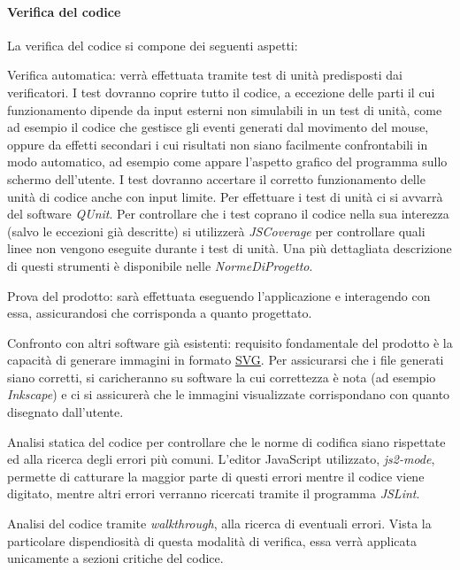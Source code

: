 \paragraph{Verifica del codice}
La verifica del codice si compone dei seguenti aspetti:
\begin{elenconumerato}[\textbf{}]{\subsubsecindent}
\item Verifica automatica: verr\`a effettuata tramite test di unit\`a predisposti dai verificatori. I test dovranno coprire tutto il codice, a eccezione delle parti il cui funzionamento dipende da input esterni non simulabili in un test di unit\`a, come ad esempio il codice che gestisce gli eventi generati dal movimento del mouse, oppure da effetti secondari i cui risultati non siano facilmente confrontabili in modo automatico, ad esempio come appare l'aspetto grafico del programma sullo schermo dell'utente. I test dovranno accertare il corretto funzionamento delle unit\`a di codice anche con input limite. Per effettuare i test di unit\`a ci si avvarr\`a del software \textit{QUnit}. Per controllare che i test coprano il codice nella sua interezza (salvo le eccezioni gi\`a descritte) si utilizzer\`a \textit{JSCoverage} per controllare quali linee non vengono eseguite durante i test di unit\`a. Una pi\`u dettagliata descrizione di questi strumenti \`e disponibile nelle \textit{NormeDiProgetto}.
\item Prova del prodotto: sar\`a effettuata eseguendo l'applicazione e interagendo con essa, assicurandosi che corrisponda a quanto progettato.
\item Confronto con altri software gi\`a esistenti: requisito fondamentale del prodotto \`e la capacit\`a di generare immagini in formato \underline{SVG}. Per assicurarsi che i file generati siano corretti, si caricheranno su software la cui correttezza \`e nota (ad esempio \textit{Inkscape}) e ci si assicurer\`a che le immagini visualizzate corrispondano con quanto disegnato dall'utente. 
\item Analisi statica del codice per controllare che le norme di codifica siano rispettate ed alla ricerca degli errori pi\`u comuni. L'editor JavaScript utilizzato, \textit{js2-mode}, permette di catturare la maggior parte di questi errori mentre il codice viene digitato, mentre altri errori verranno ricercati tramite il programma \textit{JSLint}.
\item Analisi del codice tramite \textit{walkthrough}, alla ricerca di eventuali errori. Vista la particolare dispendiosit\`a di questa modalit\`a di verifica, essa verr\`a applicata unicamente a sezioni critiche del codice.
\end{elenconumerato}


